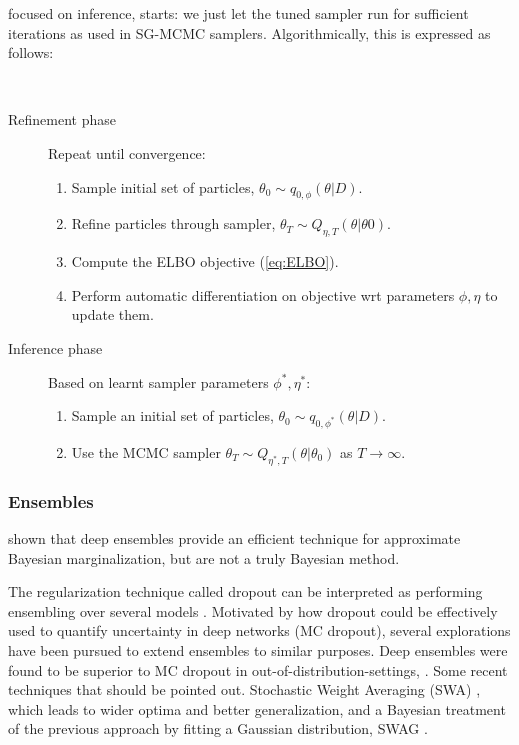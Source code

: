 focused on inference, starts: we just let the tuned sampler run for
sufficient iterations as used in SG-MCMC samplers. Algorithmically,
this is expressed as follows:
{\tt 
\begin{description}
    \item[Refinement phase] Repeat until convergence:
    \begin{enumerate}
    \item Sample initial set of particles, $\theta _0 \sim q_{0,\phi}(\theta | D)$.
    \item Refine particles through sampler, $\theta _T \sim Q_{\eta, T}(\theta |\theta 0)$.
    \item Compute the ELBO objective (\ref{eq:ELBO}). 
    \item Perform automatic differentiation on 
    objective wrt parameters $\phi, \eta$ to update them.
\end{enumerate}
    \item[Inference phase] Based on learnt sampler parameters $\phi^*, \eta^*$:
    \begin{enumerate}
    \item Sample an initial set of particles, $\theta _0 \sim q_{0,\phi^*}(\theta |D)$.
    \item Use the MCMC sampler $\theta _T \sim Q_{\eta^*, T}(\theta |\theta _0)$ as $T \rightarrow \infty$.
    \end{enumerate}
\end{description}
}


\subsubsection{Ensembles} \cite{bdl} shown that deep ensembles \citep{ensemble} provide an efficient technique for approximate Bayesian marginalization, but are not a truly Bayesian method.

The regularization technique called dropout can be interpreted as performing ensembling over several models \citep{dropout}. Motivated by how dropout could be effectively used to quantify uncertainty in deep networks \citep{pmlr-v48-gal16} (MC dropout), several explorations have been pursued to extend ensembles to similar purposes. Deep ensembles were found to be superior to MC dropout in out-of-distribution-settings, \cite{Ovadia2019CanYT}.
Some recent techniques that should be pointed out.
Stochastic Weight Averaging (SWA) \citep{izmailov2018averaging}, which leads to wider optima and better generalization, and a Bayesian treatment of the previous approach by fitting a Gaussian distribution, SWAG \citep{NEURIPS2019_118921ef}.

